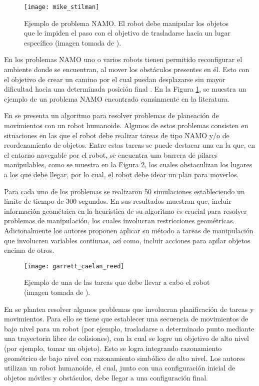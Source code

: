 %
%
%
%
%
\begin{figure}[H]
	\texttt{[image: mike\_stilman]}%
	\caption{Ejemplo de problema NAMO. El robot debe manipular los objetos que le impiden el paso con el objetivo de trasladarse hacia un lugar específico (imagen tomada de \cite{doi:10.1142/S0219843605000545}).}%
	\label{fig:S0219843605000545}%
\end{figure}
%
En los problemas NAMO uno o varios robots tienen permitido reconfigurar el ambiente donde se encuentran, al mover los obstáculos presentes en él. 
Esto con el objetivo de crear un camino por el cual puedan desplazarse sin mayor dificultad hacia una determinada posición final \cite{doi:10.1142/S0219843605000545}.
En la Figura \ref{fig:S0219843605000545}, se muestra un ejemplo de un problema NAMO encontrado comúnmente en la literatura.

En \cite{doi:10.1177/0278364917739114} se presenta un algoritmo para resolver problemas de planeación de movimientos con un robot humanoide. 
Algunos de estos problemas consisten en situaciones en las que el robot debe realizar tareas de tipo NAMO y/o de reordenamiento de objetos.
Entre estas tareas se puede destacar una en la que, en el entorno navegable por el robot, se encuentra una barrera de pilares manipulables, como se muestra en la Figura \ref{fig:0278364917739114}, los cuales obstaculizan los lugares a los que debe llegar, por lo cual, el robot debe idear un plan para moverlos.

Para cada uno de los problemas se realizaron 50 simulaciones estableciendo un límite de tiempo de 300 segundos.
En sus resultados muestran que, incluir información geométrica en la heurística de su algoritmo es crucial para resolver problemas de manipulación, los cuales involucran restricciones geométricas.
Adicionalmente los autores proponen aplicar su método a tareas de manipulación que involucren variables continuas, así como, incluir acciones para apilar objetos encima de otros.
%
\begin{figure}[H]
	\texttt{[image: garrett\_caelan\_reed]}%
	\caption{Ejemplo de una de las tareas que debe llevar a cabo el robot (imagen tomada de \cite{doi:10.1177/0278364917739114}).}%
	\label{fig:0278364917739114}%
\end{figure}
%
En \cite{Kim_Kaelbling_Lozano-Pérez_2019} se plantea resolver algunos problemas que involucran planificación de tareas y movimientos.
Para ello se tiene que establecer una secuencia de movimientos de bajo nivel para un robot (por ejemplo, trasladarse a determinado punto mediante una trayectoria libre de colisiones), con la cual se logre un objetivo de alto nivel (por ejemplo, tomar un objeto).
Esto se logra integrando razonamiento geométrico de bajo nivel con razonamiento simbólico de alto nivel. 
Los autores utilizan un robot humanoide, el cual, junto con una configuración inicial de objetos móviles y obstáculos, debe llegar a una configuración final.

